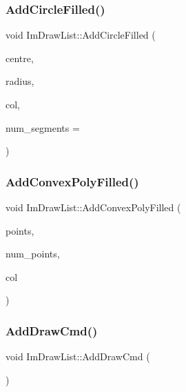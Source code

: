 \hypertarget{struct_im_draw_list_a293e87d22e17587e3994cf6deb20be45}{}\label{struct_im_draw_list_a293e87d22e17587e3994cf6deb20be45} 
\subsubsection{\texorpdfstring{Add\+Circle\+Filled()}{AddCircleFilled()}}
{\footnotesize\ttfamily void Im\+Draw\+List\+::\+Add\+Circle\+Filled (\begin{DoxyParamCaption}\item[{const \hyperlink{struct_im_vec2}{Im\+Vec2} \&}]{centre,  }\item[{float}]{radius,  }\item[{Im\+U32}]{col,  }\item[{int}]{num\+\_\+segments = {} }\end{DoxyParamCaption})}

\hypertarget{struct_im_draw_list_a9817e2a41cffdd2ff810a715bdb0eba9}{}\label{struct_im_draw_list_a9817e2a41cffdd2ff810a715bdb0eba9} 
\subsubsection{\texorpdfstring{Add\+Convex\+Poly\+Filled()}{AddConvexPolyFilled()}}
{\footnotesize\ttfamily void Im\+Draw\+List\+::\+Add\+Convex\+Poly\+Filled (\begin{DoxyParamCaption}\item[{const \hyperlink{struct_im_vec2}{Im\+Vec2} $\ast$}]{points,  }\item[{const int}]{num\+\_\+points,  }\item[{Im\+U32}]{col }\end{DoxyParamCaption})}

\hypertarget{struct_im_draw_list_a846714bb0321c6f1f908767abc8559e6}{}\label{struct_im_draw_list_a846714bb0321c6f1f908767abc8559e6} 
\subsubsection{\texorpdfstring{Add\+Draw\+Cmd()}{AddDrawCmd()}}
{\footnotesize\ttfamily void Im\+Draw\+List\+::\+Add\+Draw\+Cmd (\begin{DoxyParamCaption}{ }\end{DoxyParamCaption})}

